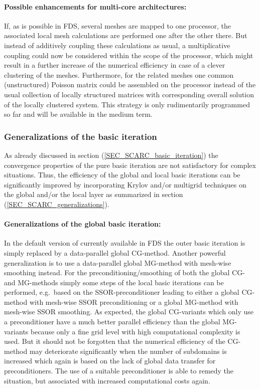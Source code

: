 \paragraph{Possible enhancements for multi-core architectures:}
If, as is possible in FDS, several meshes are mapped to one processor, the associated local mesh calculations are performed one after the other there. But instead of additively coupling these calculations as usual, a multiplicative coupling could now be considered within the scope of the processor, which might result in a further increase of the numerical efficiency in case of a clever clustering of the meshes. Furthermore, for the related meshes one common (unstructured) Poisson matrix could be assembled on the processor instead of the usual collection of locally structured matrices with corresponding overall solution of the locally clustered system. This strategy is only rudimentarily programmed so far and will be available in the medium term.



\subsubsection{Generalizations of the basic \scarc{} iteration}

As already discussed in section (\ref{SEC_SCARC_basic_iteration}) the convergence properties of the pure basic iteration are not satisfactory for complex situations. 
Thus, the efficiency of the global and local basic iterations can be significantly improved by incorporating Krylov and/or multigrid techniques on the global and/or the local layer as summarized in section (\ref{SEC_SCARC_generalizations}).

\paragraph{Generalizations of the global basic iteration:}
In the default version of \scarc{} currently available in FDS the outer basic iteration is simply replaced by a data-parallel global CG-method. 
Another powerful generalization is to use a data-parallel global MG-method with mesh-wise smoothing instead.
%
For the preconditioning/smoothing of both the global CG- and MG-methods  simply some steps of the local basic iterations can be performed, 
e.g.\ based on the SSOR-preconditioner leading to either a global CG-method with mesh-wise SSOR preconditioning or a global MG-method with mesh-wise SSOR smoothing.
%
As expected, the global CG-variants which only use a \ols{} preconditioner have a much better parallel efficiency than the global MG-variants because only a fine grid level with high computational complexity is used. But it should not be forgotten that the numerical efficiency of the CG-method may deteriorate significantly when the number of subdomains is increased 
which again is based on the lack of global data transfer for \ols{} preconditioners. The use of a suitable \tls{} preconditioner is able to remedy the situation, but associated with increased computational costs again.

